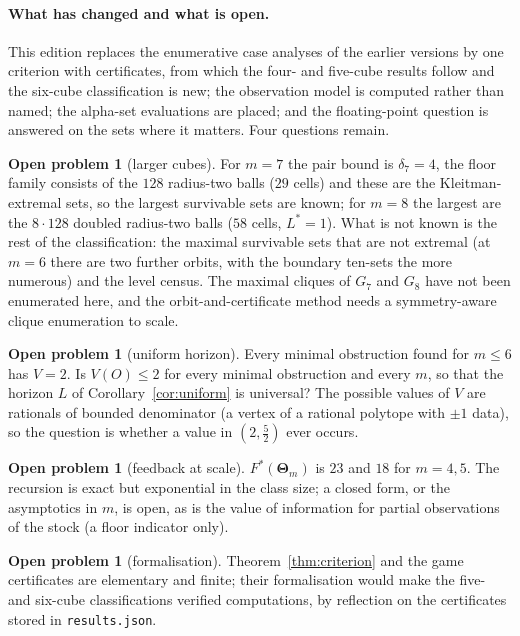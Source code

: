 \documentclass[11pt,a4paper]{article}
\theoremstyle{plain}
\theoremstyle{definition}
\newtheorem{openproblem}[theorem]{Open problem}
\theoremstyle{remark}
\let\GreekTheta\Theta
\renewcommand{\Theta}{\boldsymbol{\GreekTheta}}
\newcommand{\tfr}[2]{\tfrac{#1}{#2}}
\newcommand{\Lstar}{L^{\ast}}
\newcommand{\Fstar}{F^{\ast}}
\begin{document}
\paragraph{What has changed and what is open.}
This edition replaces the enumerative case analyses of the earlier versions by one criterion with certificates, from which the four- and five-cube results follow and the six-cube classification is new; the observation model is computed rather than named; the alpha-set evaluations are placed; and the floating-point question is answered on the sets where it matters. Four questions remain.
\begin{openproblem}[larger cubes]
For $m=7$ the pair bound is $\delta_7=4$, the floor family consists of the $128$ radius-two balls ($29$ cells) and these are the Kleitman-extremal sets, so the largest survivable sets are known; for $m=8$ the largest are the $8\cdot128$ doubled radius-two balls ($58$ cells, $\Lstar=1$). What is not known is the rest of the classification: the maximal survivable sets that are not extremal (at $m=6$ there are two further orbits, with the boundary ten-sets the more numerous) and the level census. The maximal cliques of $G_7$ and $G_8$ have not been enumerated here, and the orbit-and-certificate method needs a symmetry-aware clique enumeration to scale.
\end{openproblem}
\begin{openproblem}[uniform horizon]
Every minimal obstruction found for $m\le6$ has $V=2$. Is $V(O)\le2$ for every minimal obstruction and every $m$, so that the horizon $L$ of Corollary~\ref{cor:uniform} is universal? The possible values of $V$ are rationals of bounded denominator (a vertex of a rational polytope with $\pm1$ data), so the question is whether a value in $(2,\tfr52)$ ever occurs.
\end{openproblem}
\begin{openproblem}[feedback at scale]
$\Fstar(\Theta_m)$ is $23$ and $18$ for $m=4,5$. The recursion is exact but exponential in the class size; a closed form, or the asymptotics in $m$, is open, as is the value of information for partial observations of the stock (a floor indicator only).
\end{openproblem}
\begin{openproblem}[formalisation]
Theorem~\ref{thm:criterion} and the game certificates are elementary and finite; their formalisation would make the five- and six-cube classifications verified computations, by reflection on the certificates stored in \texttt{results.json}.
\end{openproblem}
\end{document}
